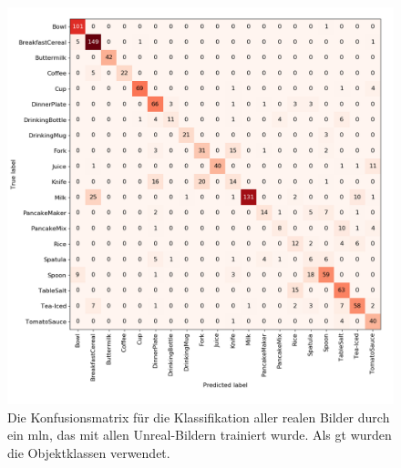 \begin{figure}
\centering
	\includegraphics[scale=.3]{img/chapter6/UnrealRealGTClass.png}
\caption[Konfusionsmatrix der Objektklassen Klassifikation mit Unreal-Trainingsset und realem Testset]{Die Konfusionsmatrix für die Klassifikation aller realen Bilder durch ein \gls{mln}, das mit allen Unreal-Bildern trainiert wurde. Als \gls{gt} wurden die Objektklassen verwendet.}
\label{fig:UnrealRealGTClass_confMatrix}
\end{figure}  


